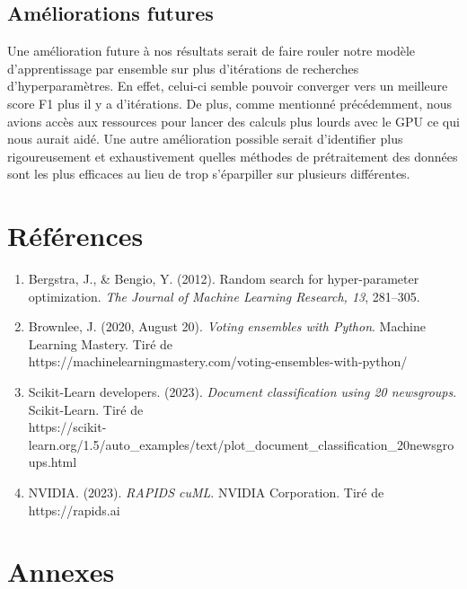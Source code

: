 \documentclass{article}
\begin{document}
\subsection{Améliorations futures}
Une amélioration future à nos résultats serait de faire rouler notre modèle d'apprentissage par ensemble sur plus d'itérations de recherches d'hyperparamètres. En effet, celui-ci semble pouvoir converger vers un meilleure score F1 plus il y a d'itérations. De plus, comme mentionné précédemment, nous avions accès aux ressources pour lancer des calculs plus lourds avec le GPU ce qui nous aurait aidé. Une autre amélioration possible serait d'identifier plus rigoureusement et exhaustivement quelles méthodes de prétraitement des données sont les plus efficaces au lieu de trop s'éparpiller sur plusieurs différentes.

\newpage
\section{Références}
\begin{enumerate}
    \item \label{bergstra2012random} Bergstra, J., \& Bengio, Y. (2012). Random search for hyper-parameter optimization. \textit{The Journal of Machine Learning Research, 13}, 281–305.
    \item Brownlee, J. (2020, August 20). \textit{Voting ensembles with Python}. Machine Learning Mastery. Tiré de \\    https://machinelearningmastery.com/voting-ensembles-with-python/
    \item Scikit-Learn developers. (2023). \textit{Document classification using 20 newsgroups}. Scikit-Learn. Tiré de \\ https://scikit-learn.org/1.5/auto\_examples/text/plot\_document\_classification\_20newsgroups.html
    \item NVIDIA. (2023). \textit{RAPIDS cuML}. NVIDIA Corporation. Tiré de https://rapids.ai

\end{enumerate}

\section{Annexes}
\end{document}
